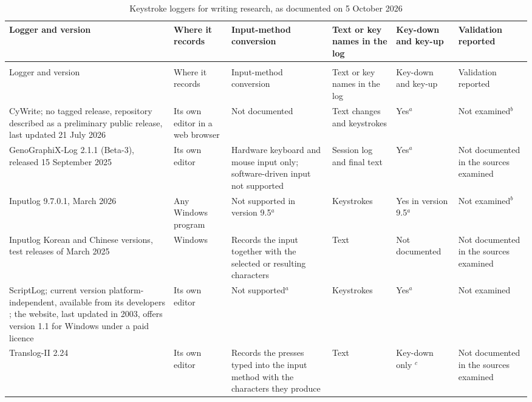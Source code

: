 \begin{landscape}
{\tablebodyfont
\begin{longtable}{L{0.17}L{0.14}L{0.19}L{0.14}L{0.13}L{0.21}}
\caption{Keystroke loggers for writing research, as documented on 5 October 2026}
\label{tab:loggers}\\
\toprule
Logger and version & Where it records & Input-method conversion & Text or key names in the log & Key-down and key-up & Validation reported \\
\midrule
\endfirsthead
{}\\
\toprule
Logger and version & Where it records & Input-method conversion & Text or key names in the log & Key-down and key-up & Validation reported \\
\midrule
\endhead
CyWrite; no tagged release, repository described as a preliminary public release, last updated 21 July 2026 \citep{cywrite-repo} & Its own editor in a web browser \citep{wengelin2023,cywrite-repo} & Not documented & Text changes and keystrokes \citep{wengelin2023} & Yes$^{a}$ & Not examined$^{b}$ \\
GenoGraphiX-Log 2.1.1 (Beta-3), released 15 September 2025 \citep{ggxlog-web} & Its own editor \citep{wengelin2023} & Hardware keyboard and mouse input only; software-driven input not supported \citep{ggxlog-web} & Session log and final text \citep{ggxlog-web} & Yes$^{a}$ & Not documented in the sources examined \\
Inputlog 9.7.0.1, March 2026 \citep{inputlog-web} & Any Windows program \citep{inputlog-web} & Not supported in version 9.5$^{a}$ & Keystrokes \citep{wengelin2023} & Yes in version 9.5$^{a}$ & Not examined$^{b}$ \\
Inputlog Korean and Chinese versions, test releases of March 2025 \citep{inputlog-web} & Windows & Records the input together with the selected or resulting characters \citep{inputlog-web} & Text & Not documented & Not documented in the sources examined \\
ScriptLog; current version platform-independent, available from its developers \citep{wengelin2023}; the website, last updated in 2003, offers version 1.1 for Windows under a paid licence \citep{scriptlog-web} & Its own editor \citep{wengelin2023} & Not supported$^{a}$ & Keystrokes \citep{wengelin2023} & Yes$^{a}$ & Not examined \\
Translog-II 2.24 \citep{translog-web} & Its own editor \citep{wengelin2023} & Records the presses typed into the input method with the characters they produce \citep{zou2026} & Text \citep{zou2026} & Key-down only \citep{zou2026}$^{c}$ & Not documented in the sources examined \\

\end{longtable}}
\end{landscape}
